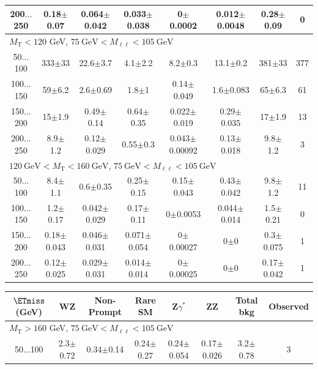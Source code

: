 \begin{landscape}
\begin{table}
\begin{center}
\begin{tabular}{| c | c c c c c c c | }
200$\dots$250&0.18$\pm$0.07&0.064$\pm$0.042&0.033$\pm$0.038&0$\pm$0.0002&0.012$\pm$0.0048&0.28$\pm$0.09&0\\
\hline\hline
\multicolumn{7}{l}{$M_{\text{T}} < 120$ GeV, $75~\mathrm{GeV} < M_{\ell\ell} < 105~\mathrm{GeV}$}\\\hline\hline
50$\dots$100&333$\pm$33&22.6$\pm$3.7&4.1$\pm$2.2&8.2$\pm$0.3&13.1$\pm$0.2&381$\pm$33&377\\
100$\dots$150&59$\pm$6.2&2.6$\pm$0.69&1.8$\pm$1&0.14$\pm$0.049&1.6$\pm$0.083&65$\pm$6.3&61\\
150$\dots$200&15$\pm$1.9&0.49$\pm$0.14&0.64$\pm$0.35&0.022$\pm$0.019&0.29$\pm$0.035&17$\pm$1.9&13\\
200$\dots$250&8.9$\pm$1.2&0.12$\pm$0.029&0.55$\pm$0.3&0.043$\pm$0.00092&0.13$\pm$0.018&9.8$\pm$1.2&3\\
\hline\hline
\multicolumn{7}{l}{$120~\mathrm{GeV} < M_{\text{T}} < 160~\mathrm{GeV}$, $75~\mathrm{GeV} < M_{\ell\ell} < 105~\mathrm{GeV}$}\\\hline\hline
50$\dots$100&8.4$\pm$1.1&0.6$\pm$0.35&0.25$\pm$0.15&0.15$\pm$0.043&0.43$\pm$0.042&9.8$\pm$1.2&11\\
100$\dots$150&1.2$\pm$0.17&0.042$\pm$0.029&0.17$\pm$0.11&0$\pm$0.0053&0.044$\pm$0.014&1.5$\pm$0.21&0\\
150$\dots$200&0.18$\pm$0.043&0.046$\pm$0.031&0.071$\pm$0.054&0$\pm$0.00027&0$\pm$0&0.3$\pm$0.075&1\\
200$\dots$250&0.12$\pm$0.025&0.029$\pm$0.031&0.014$\pm$0.014&0$\pm$0.00025&0$\pm$0&0.17$\pm$0.042&1\\
\hline\hline
\end{tabular}
\end{center}
\end{table}
\begin{table}
\begin{center}
\begin{tabular}{| c | c c c c c c c | }\hline\hline
$\ETmiss$ (GeV) & WZ & Non-Prompt & Rare SM & Z$\gamma^*$ & ZZ & Total bkg & Observed\\\hline\hline
\multicolumn{7}{l}{$M_{\text{T}} > 160$ GeV, $75~\mathrm{GeV} < M_{\ell\ell} < 105~\mathrm{GeV}$}\\\hline\hline
50$\dots$100&2.3$\pm$0.72&0.34$\pm$0.14&0.24$\pm$0.27&0.24$\pm$0.054&0.17$\pm$0.026&3.2$\pm$0.78&3\\

\end{tabular}
\end{center}
\end{table}
\end{landscape}
